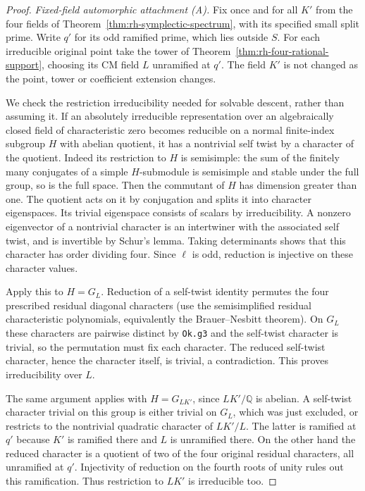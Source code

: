 \begin{proof}
\emph{Fixed-field automorphic attachment (A).}
Fix once and for all $K'$ from the four fields
of Theorem~\ref{thm:rh-symplectic-spectrum},
with its specified small split prime. Write
$q'$ for its odd ramified prime, which lies
outside $S$. For each irreducible original
point take the tower of
Theorem~\ref{thm:rh-four-rational-support},
choosing its CM field $L$ unramified at $q'$.
The field $K'$ is not changed as the point,
tower or coefficient extension changes.

We check the restriction irreducibility needed
for solvable descent, rather than assuming it.
If an absolutely irreducible representation
over an algebraically closed field of
characteristic zero becomes reducible on a
normal finite-index subgroup $H$ with abelian
quotient, it has a nontrivial self twist by a
character of the quotient. Indeed its restriction
to $H$ is semisimple: the sum of the finitely
many conjugates of a simple $H$-submodule
is semisimple and stable under the full
group, so is the full space. Then the
commutant of $H$ has dimension greater
than one. The quotient acts on it by
conjugation and splits it into character
eigenspaces. Its trivial eigenspace consists
of scalars by irreducibility. A nonzero
eigenvector of a nontrivial character is an
intertwiner with the associated self twist,
and is invertible by Schur's lemma.
Taking determinants shows that this
character has order dividing four.
Since $\ell$ is odd, reduction is injective
on these character values.

Apply this to $H=G_L$. Reduction of a
self-twist identity permutes the four
prescribed residual diagonal characters
(use the semisimplified residual
characteristic polynomials, equivalently
the Brauer--Nesbitt theorem). On $G_L$
these characters are pairwise distinct
by \texttt{Ok.g3} and the self-twist
character is trivial, so the permutation
must fix each character. The reduced
self-twist character, hence the character
itself, is trivial, a contradiction.
This proves irreducibility over $L$.

The same argument applies with $H=G_{LK'}$,
since $LK'/\mathbb Q$ is abelian. A self-twist
character trivial on this group is either
trivial on $G_L$, which was just excluded,
or restricts to the nontrivial quadratic
character of $LK'/L$. The latter is ramified
at $q'$ because $K'$ is ramified there and
$L$ is unramified there. On the other hand
the reduced character is a quotient of
two of the four original residual
characters, all unramified at $q'$.
Injectivity of reduction on the fourth
roots of unity rules out this ramification.
Thus restriction to $LK'$ is irreducible too.


\end{proof}
